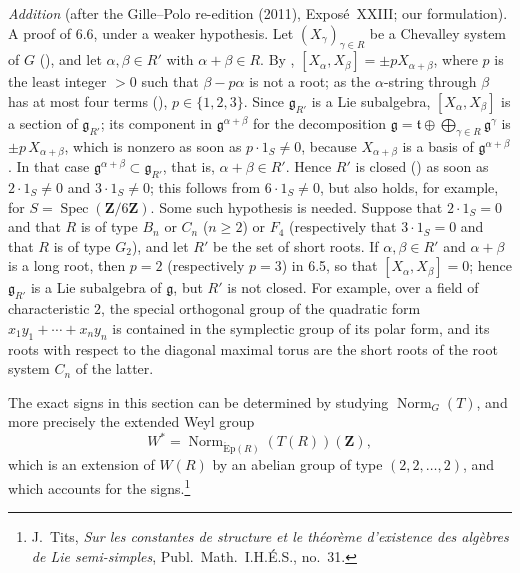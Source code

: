 \emph{Addition} (after the Gille--Polo re-edition (2011), Exposé~XXIII; our
formulation). A proof of 6.6, under a weaker hypothesis. Let
\((X_\gamma)_{\gamma\in R}\) be a Chevalley system of \(G\)
(), and let \(\alpha,\beta\in R'\) with
\(\alpha+\beta\in R\). By ,
\([X_\alpha,X_\beta]=\pm pX_{\alpha+\beta}\), where \(p\) is the least integer \(>0\)
such that \(\beta-p\alpha\) is not a root; as the \(\alpha\)-string through \(\beta\) has
at most four terms (), \(p\in\{1,2,3\}\). Since
\(\mathfrak g_{R'}\) is a Lie subalgebra, \([X_\alpha,X_\beta]\) is a section of
\(\mathfrak g_{R'}\); its component in \(\mathfrak g^{\alpha+\beta}\) for the
decomposition \(\mathfrak g=\mathfrak t\oplus\bigoplus_{\gamma\in R}\mathfrak g^\gamma\)
is \(\pm p\,X_{\alpha+\beta}\), which is nonzero as soon as \(p\cdot1_S\ne0\), because
\(X_{\alpha+\beta}\) is a basis of \(\mathfrak g^{\alpha+\beta}\). In that case
\(\mathfrak g^{\alpha+\beta}\subset\mathfrak g_{R'}\), that is, \(\alpha+\beta\in R'\).
Hence \(R'\) is closed () as soon as
\(2\cdot1_S\ne0\) and \(3\cdot1_S\ne0\); this follows from \(6\cdot1_S\ne0\), but also
holds, for example, for \(S=\operatorname{Spec}(\mathbf Z/6\mathbf Z)\). Some such
hypothesis is needed. Suppose that \(2\cdot1_S=0\) and that \(R\) is of type \(B_n\) or
\(C_n\) (\(n\ge2\)) or \(F_4\) (respectively that \(3\cdot1_S=0\) and that \(R\) is of
type \(G_2\)), and let \(R'\) be the set of short roots. If \(\alpha,\beta\in R'\) and
\(\alpha+\beta\) is a long root, then \(p=2\) (respectively \(p=3\)) in 6.5, so that
\([X_\alpha,X_\beta]=0\); hence \(\mathfrak g_{R'}\) is a Lie subalgebra of \(\mathfrak g\),
but \(R'\) is not closed. For example, over a field of characteristic \(2\), the special
orthogonal group of the quadratic form \(x_1y_1+\cdots+x_ny_n\) is contained in the
symplectic group of its polar form, and its roots with respect to the diagonal maximal
torus are the short roots of the root system \(C_n\) of the latter.

The exact signs in this section can be determined by studying
\(\operatorname{Norm}_G(T)\), and more precisely the extended Weyl
group
\[
  W^*=\operatorname{Norm}_{\operatorname{\acute Ep}(R)}(T(R))(\mathbf Z),
\]
which is an extension of \(W(R)\) by an abelian group of type
\((2,2,\ldots,2)\), and which accounts for the signs.\footnote{J.~Tits, \textit{Sur les constantes de
structure et le théorème d'existence des algèbres de Lie semi-simples}, Publ.\ Math.\
I.H.É.S., no.~31.}

